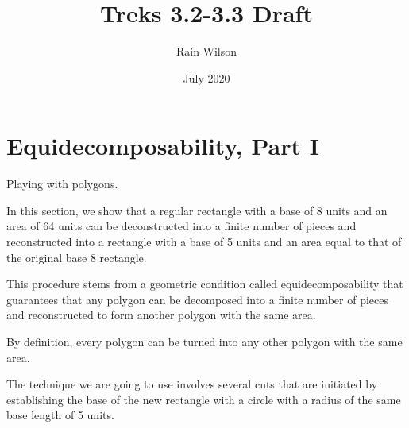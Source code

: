 \documentclass{article}
\title{Treks 3.2-3.3 Draft}
\author{Rain Wilson}
\date{July 2020}
\begin{document}
\maketitle


\section{Equidecomposability, Part I}

Playing with polygons.



In this section, we show that a regular rectangle with a base of 8 units and an area of 64 units can be deconstructed into a finite number of pieces and reconstructed into a rectangle with a base of 5 units and an area equal to that of the original base 8 rectangle.


This procedure stems from a geometric condition called equidecomposability that guarantees that any polygon can be decomposed into a finite number of pieces and reconstructed to form another polygon with the same area.


By definition, every polygon can be turned into any other polygon with the same area.


The technique we are going to use involves several cuts that are initiated by establishing the base of the new rectangle with a circle with a radius of the same base length of 5 units.

\end{document}
